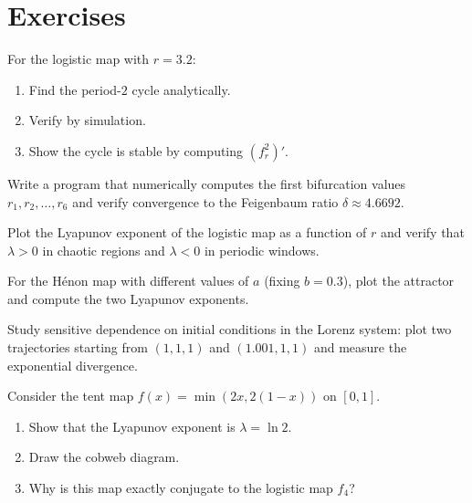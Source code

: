 \section{Exercises}

\begin{exercise}
For the logistic map with $r=3.2$:
\begin{enumerate}
  \item Find the period-$2$ cycle analytically.
  \item Verify by simulation.
  \item Show the cycle is stable by computing $(f_r^2)'$.
\end{enumerate}
\end{exercise}

\begin{exercise}
Write a program that numerically computes the first bifurcation
values $r_1, r_2, \ldots, r_6$ and verify convergence to the
Feigenbaum ratio $\delta\approx 4.6692$.
\end{exercise}

\begin{exercise}
Plot the Lyapunov exponent of the logistic map as a function of $r$
and verify that $\lambda>0$ in chaotic regions and $\lambda<0$ in
periodic windows.
\end{exercise}

\begin{exercise}
For the H\'enon map with different values of $a$ (fixing $b=0.3$),
plot the attractor and compute the two Lyapunov exponents.
\end{exercise}

\begin{exercise}
Study sensitive dependence on initial conditions in the Lorenz
system: plot two trajectories starting from $(1,1,1)$ and
$(1.001,1,1)$ and measure the exponential divergence.
\end{exercise}

\begin{exercise}
Consider the tent map $f(x)=\min(2x, 2(1-x))$ on $[0,1]$.
\begin{enumerate}
  \item Show that the Lyapunov exponent is $\lambda=\ln 2$.
  \item Draw the cobweb diagram.
  \item Why is this map exactly conjugate to the logistic map $f_4$?
\end{enumerate}
\end{exercise}
